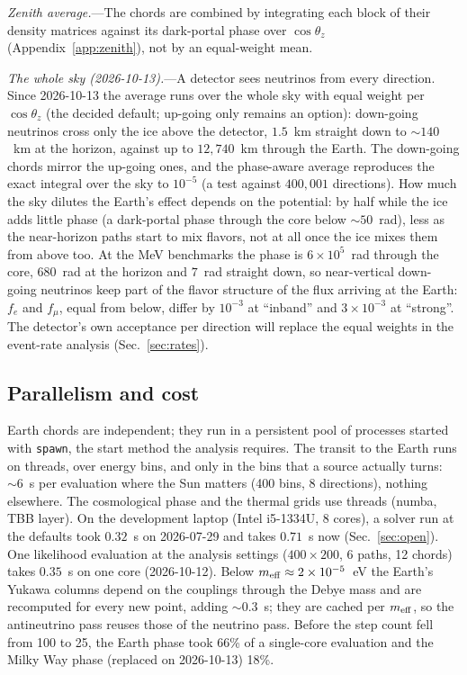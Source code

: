 \documentclass[11pt,a4paper]{article}
\begin{document}
\textit{Zenith average.}---The chords are combined by integrating each block of their density
matrices against its dark-portal phase over $\cos\theta_z$ (Appendix~\ref{app:zenith}), not by
an equal-weight mean.

\textit{The whole sky (2026-10-13).}---A detector sees neutrinos from every direction. Since
2026-10-13 the average runs over the whole sky with equal weight per $\cos\theta_z$ (the decided
default; up-going only remains an option): down-going neutrinos cross only the ice above the
detector, $1.5$~km straight down to $\sim140$~km at the horizon, against up to $12{,}740$~km
through the Earth. The down-going chords mirror the up-going ones, and the phase-aware average
reproduces the exact integral over the sky to $10^{-5}$ (a test against $400{,}001$ directions).
How much the sky dilutes the Earth's effect depends on the potential: by half while the ice adds
little phase (a dark-portal phase through the core below $\sim50$~rad), less as the near-horizon
paths start to mix flavors, not at all once the ice mixes them from above too. At the MeV
benchmarks the phase is $6\times10^{5}$~rad through the core, $680$~rad at the horizon and
$7$~rad straight down, so near-vertical down-going neutrinos keep part of the flavor structure of
the flux arriving at the Earth: $f_e$ and $f_\mu$, equal from below, differ by $10^{-3}$ at
``inband'' and $3\times10^{-3}$ at ``strong''. The detector's own acceptance per direction will
replace the equal weights in the event-rate analysis (Sec.~\ref{sec:rates}).

\subsection{Parallelism and cost}

Earth chords are independent; they run in a persistent pool of processes started with
\texttt{spawn}, the start method the analysis requires. The transit to the Earth runs on threads,
over energy bins, and only in the bins that a source actually turns: $\sim6$~s per evaluation
where the Sun matters (400 bins, 8 directions), nothing elsewhere. The cosmological phase
and the thermal grids use threads (numba, TBB layer). On the development laptop (Intel
i5-1334U, 8 cores), a solver run at the defaults took $0.32$~s on 2026-07-29 and takes
$0.71$~s now (Sec.~\ref{sec:open}). One likelihood evaluation at the analysis settings
($400\times200$, 6 paths, 12 chords) takes $0.35$~s on one core (2026-10-12). Below
$m_{\rm eff}\approx2\times10^{-5}$~eV the Earth's Yukawa columns depend on the couplings through
the Debye mass and are recomputed for every new point, adding $\sim0.3$~s; they are cached per
$m_{\rm eff}$, so the antineutrino pass reuses those of the neutrino pass. Before the step count fell from 100 to 25, the Earth phase took 66\% of a
single-core evaluation and the Milky Way phase (replaced on 2026-10-13) 18\%.
\end{document}
